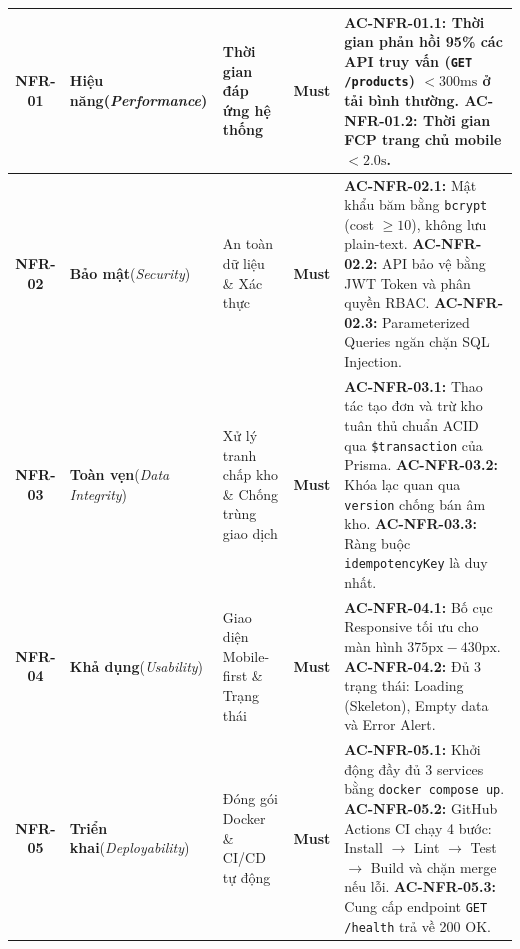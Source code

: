 \documentclass[12pt,a4paper]{article}
\begin{document}
\begin{xltabular}{\textwidth}{|c|>{\raggedright\arraybackslash}p{2.8cm}|>{\raggedright\arraybackslash}p{4cm}|c|>{\raggedright\arraybackslash}X|}
\textbf{NFR-01} & \textbf{Hiệu năng}\newline(\textit{Performance}) & Thời gian đáp ứng hệ thống & \textbf{Must} & 
\textbf{AC-NFR-01.1:} Thời gian phản hồi 95\% các API truy vấn (\texttt{GET /products}) $< 300\text{ms}$ ở tải bình thường.\newline
\textbf{AC-NFR-01.2:} Thời gian FCP trang chủ mobile $< 2.0\text{s}$. \\
\hline
\textbf{NFR-02} & \textbf{Bảo mật}\newline(\textit{Security}) & An toàn dữ liệu \& Xác thực & \textbf{Must} & 
\textbf{AC-NFR-02.1:} Mật khẩu băm bằng \texttt{bcrypt} (cost $\ge 10$), không lưu plain-text.\newline
\textbf{AC-NFR-02.2:} API bảo vệ bằng JWT Token và phân quyền RBAC.\newline
\textbf{AC-NFR-02.3:} Parameterized Queries ngăn chặn SQL Injection. \\
\hline
\textbf{NFR-03} & \textbf{Toàn vẹn}\newline(\textit{Data Integrity}) & Xử lý tranh chấp kho \& Chống trùng giao dịch & \textbf{Must} & 
\textbf{AC-NFR-03.1:} Thao tác tạo đơn và trừ kho tuân thủ chuẩn ACID qua \texttt{\$transaction} của Prisma.\newline
\textbf{AC-NFR-03.2:} Khóa lạc quan qua \texttt{version} chống bán âm kho.\newline
\textbf{AC-NFR-03.3:} Ràng buộc \texttt{idempotencyKey} là duy nhất. \\
\hline
\textbf{NFR-04} & \textbf{Khả dụng}\newline(\textit{Usability}) & Giao diện Mobile-first \& Trạng thái & \textbf{Must} & 
\textbf{AC-NFR-04.1:} Bố cục Responsive tối ưu cho màn hình $375\text{px} - 430\text{px}$.\newline
\textbf{AC-NFR-04.2:} Đủ 3 trạng thái: Loading (Skeleton), Empty data và Error Alert. \\
\hline
\textbf{NFR-05} & \textbf{Triển khai}\newline(\textit{Deployability}) & Đóng gói Docker \& CI/CD tự động & \textbf{Must} & 
\textbf{AC-NFR-05.1:} Khởi động đầy đủ 3 services bằng \texttt{docker compose up}.\newline
\textbf{AC-NFR-05.2:} GitHub Actions CI chạy 4 bước: Install $\rightarrow$ Lint $\rightarrow$ Test $\rightarrow$ Build và chặn merge nếu lỗi.\newline
\textbf{AC-NFR-05.3:} Cung cấp endpoint \texttt{GET /health} trả về 200 OK. \\
\end{xltabular}
\end{document}
